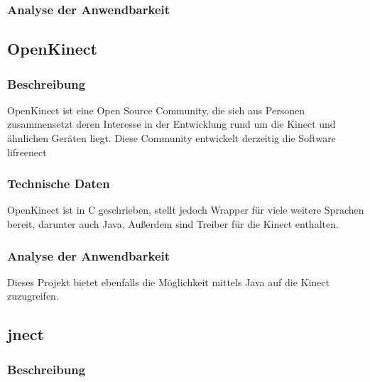 \subsubsection{Analyse der Anwendbarkeit}



\subsection{OpenKinect}

\subsubsection{Beschreibung}

OpenKinect ist eine Open Source Community, die sich aus Personen zusammensetzt deren Interesse in der Entwicklung rund um die Kinect und ähnlichen Geräten liegt.
Diese Community entwickelt derzeitig die Software lifreenect

\subsubsection{Technische Daten}

OpenKinect ist in C geschrieben, stellt jedoch Wrapper für viele weitere Sprachen bereit\footnotemark[12], darunter auch Java. Außerdem sind Treiber für die Kinect enthalten.


\subsubsection{Analyse der Anwendbarkeit}

Dieses Projekt bietet ebenfalls die Möglichkeit mittels Java auf die Kinect zuzugreifen. 


\subsection{jnect}
\label{subsec:jnect}

\subsubsection{Beschreibung}

